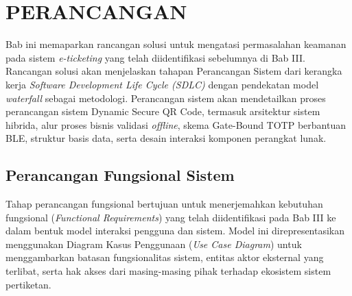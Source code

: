 \cleardoublepage
\chapter{PERANCANGAN}
\label{chap:desain-konsep-solusi}
Bab ini memaparkan rancangan solusi untuk mengatasi permasalahan keamanan pada sistem \textit{e-ticketing} yang telah diidentifikasi sebelumnya di Bab III. Rancangan solusi akan menjelaskan tahapan Perancangan Sistem dari kerangka kerja \textit{Software Development Life Cycle (SDLC)} dengan pendekatan model \textit{waterfall} sebagai metodologi. Perancangan sistem akan mendetailkan proses perancangan sistem Dynamic Secure QR Code, termasuk arsitektur sistem hibrida, alur proses bisnis validasi \textit{offline}, skema Gate-Bound TOTP berbantuan BLE, struktur basis data, serta desain interaksi komponen perangkat lunak.

\section{Perancangan Fungsional Sistem}
\label{sec:perancangan_fungsional}

Tahap perancangan fungsional bertujuan untuk menerjemahkan kebutuhan fungsional (\textit{Functional Requirements}) yang telah diidentifikasi pada Bab III ke dalam bentuk model interaksi pengguna dan sistem. Model ini direpresentasikan menggunakan Diagram Kasus Penggunaan (\textit{Use Case Diagram}) untuk menggambarkan batasan fungsionalitas sistem, entitas aktor eksternal yang terlibat, serta hak akses dari masing-masing pihak terhadap ekosistem sistem pertiketan.

